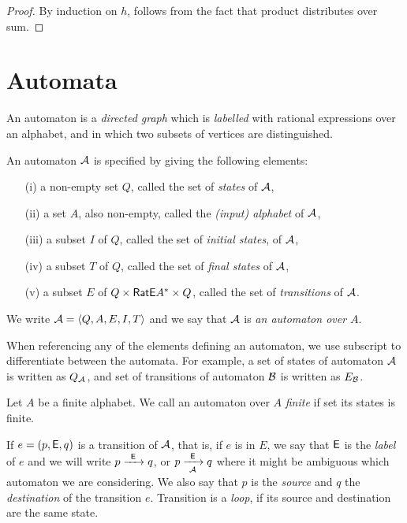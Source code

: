 \begin{proof}
    By induction on $h$, follows from the fact that product distributes over sum.
\end{proof}

\section{Automata}

An automaton is a \emph{directed graph} which is \emph{labelled} with rational expressions over an alphabet, and in which two subsets of vertices are distinguished.

\begin{defn}
    An automaton ${\mathcal{A}}$ is specified by giving the following elements:
    \begin{itemize}
        \item[(i)] a non-empty set $Q$, called the set of \emph{states} of ${\mathcal{A}}$,
        \item[(ii)] a set $A$, also non-empty, called the \emph{(input) alphabet} of ${\mathcal{A}}$,
        \item[(iii)] a subset $I$ of $Q$, called the set of \emph{initial states}, of ${\mathcal{A}}$,
        \item[(iv)] a subset $T$ of $Q$, called the set of \emph{final states} of ${\mathcal{A}}$,
        \item[(v)] a subset $E$ of $Q \times {\mathsf{RatE}} A^* \times Q$, called the set of \emph{transitions} of ${\mathcal{A}}$.
    \end{itemize}
    We write ${\mathcal{A}} = \langle Q, A, E, I, T \rangle$ and we say that ${\mathcal{A}}$ is \emph{an automaton over $A$}.
\end{defn}

When referencing any of the elements defining an automaton, we use subscript to differentiate between the automata. For example, a set of states of automaton ${\mathcal{A}}$ is written as $Q_{{\mathcal{A}}}$, and set of transitions of automaton ${\mathcal{B}}$ is written as $E_{{\mathcal{B}}}$.

Let $A$ be a finite alphabet. We call an automaton over $A$ \emph{finite} if set its states is finite.

If $e = (p, {\mathsf{E}}, q)$ is a transition of ${\mathcal{A}}$, that is, if $e$ is in $E$, we say that ${\mathsf{E}}$ is the \emph{label} of $e$ and we will write $p {\; \xrightarrow[]{\: \; {\mathsf{E}} \: \;} \;} q$, or $p {\; \xrightarrow[{\mathcal{A}}]{\: \; {\mathsf{E}} \: \;} \;} q$ where it might be ambiguous which automaton we are considering. We also say that $p$ is the \emph{source} and $q$ the \emph{destination} of the transition $e$. Transition is a \emph{loop}, if its source and destination are the same state.

